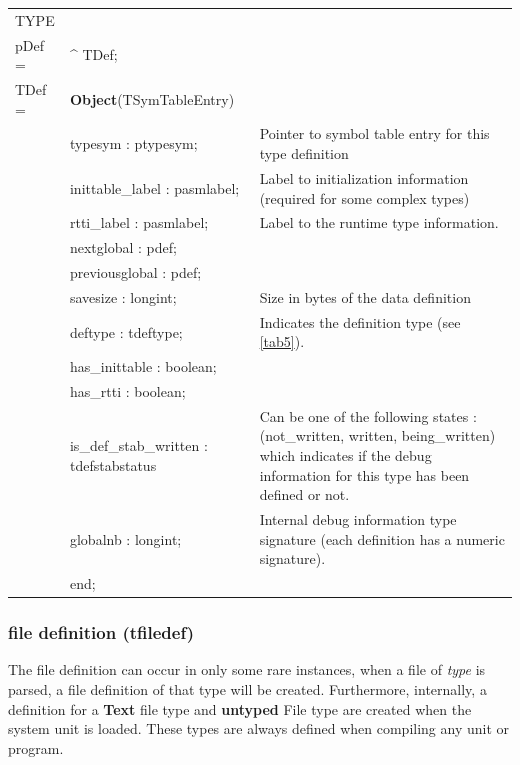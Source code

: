 \documentclass [12pt]{article}
\begin{document}
\begin{tabular*}{6.5in}{|l@{\extracolsep{\fill}}lp{7cm}|}
\hline
\textsf{TYPE} & & \\
\xspace pDef = & \^{}  TDef; & \\
\xspace \textsf{TDef} = & \textbf{Object}(TSymTableEntry) & \\
&\textsf{typesym : ptypesym;}& 
	Pointer to symbol table entry for this type definition \\
&\textsf{inittable{\_}label : pasmlabel;}& 
	Label to initialization information (required for some complex types) \\
&\textsf{rtti{\_}label : pasmlabel;}& 
	Label to the runtime type information. \\
&\textsf{nextglobal : pdef;}&  \\
&\textsf{previousglobal : pdef;}&  \\
&\textsf{savesize : longint;}& 
	Size in bytes of the data definition \\
&\textsf{deftype : tdeftype;}& 
	Indicates the definition type (see \ref{tab5}). \\
&\textsf{has{\_}inittable : boolean;}&  \\
&\textsf{has{\_}rtti : boolean;}&  \\
&\textsf{is{\_}def{\_}stab{\_}written : tdefstabstatus}& 
	Can be one of the following states : (\textsf{not{\_}written,
	written, being{\_}written}) which indicates if the debug information
	for this type has been defined or not. \\
&\textsf{globalnb : longint;}& 
	Internal debug information type signature (each definition has a
	numeric signature). \\
&\textsf{end;}&  \\
\hline
\end{tabular*}

\subsubsection{file definition (tfiledef)}
\label{subsubsec:mylabel6}

The file definition can occur in only some rare instances, when a 
\textsf{file of }\textsf{\textit{type}} is parsed, a file definition of that 
type will be created. Furthermore, internally, a definition for a 
\textbf{Text} file type and \textbf{untyped} File type are created when the 
system unit is loaded. These types are always defined when compiling any 
unit or program.
\end{document}

